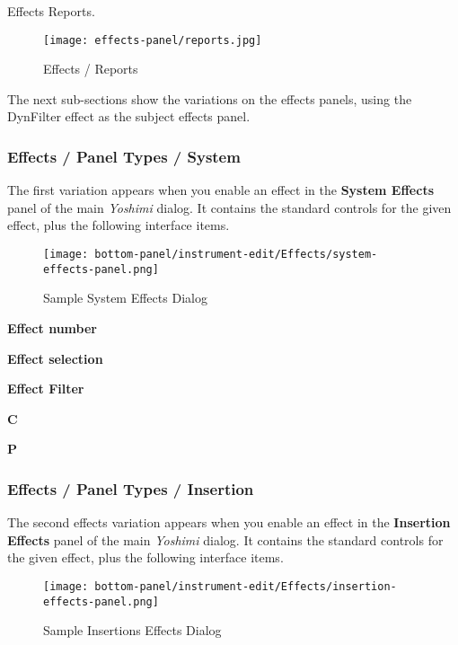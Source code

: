    Effects Reports.

\begin{figure}[H]
   \centering 
   \texttt{[image: effects-panel/reports.jpg]}
   \caption{Effects / Reports}
   \label{fig:effects_reports}
\end{figure}

   The next sub-sections show the variations on the effects panels, using the
   DynFilter effect as the subject effects panel.

\subsubsection{Effects / Panel Types / System }
\label{subsubsec:effects_paneltypes_system}

   The first variation
   appears when you enable an effect in the
   \textbf{System Effects}
   panel of the main \textsl{Yoshimi} dialog.  It contains the standard
   controls for the given effect, plus the following interface items.

\begin{figure}[H]
   \centering 
   \texttt{[image: bottom-panel/instrument-edit/Effects/system-effects-panel.png]}
   \caption{Sample System Effects Dialog}
   \label{fig:sample_system_effects_dialog}
\end{figure}
   
   \begin{enumber}
      \item \textbf{Effect number}
      \item \textbf{Effect selection}
      \item \textbf{Effect Filter}
      \item \textbf{C}
      \item \textbf{P}
   \end{enumber}

\subsubsection{Effects / Panel Types / Insertion }
\label{subsubsec:effects_paneltypes_insertion}

   The second effects variation
   appears when you enable an effect in the
   \textbf{Insertion Effects}
   panel of the main \textsl{Yoshimi} dialog.
   It contains the standard
   controls for the given effect, plus the following interface items.

\begin{figure}[H]
   \centering 
   \texttt{[image: bottom-panel/instrument-edit/Effects/insertion-effects-panel.png]}
   \caption{Sample Insertions Effects Dialog}
   \label{fig:sample_insertion_effects_dialog}
\end{figure}

